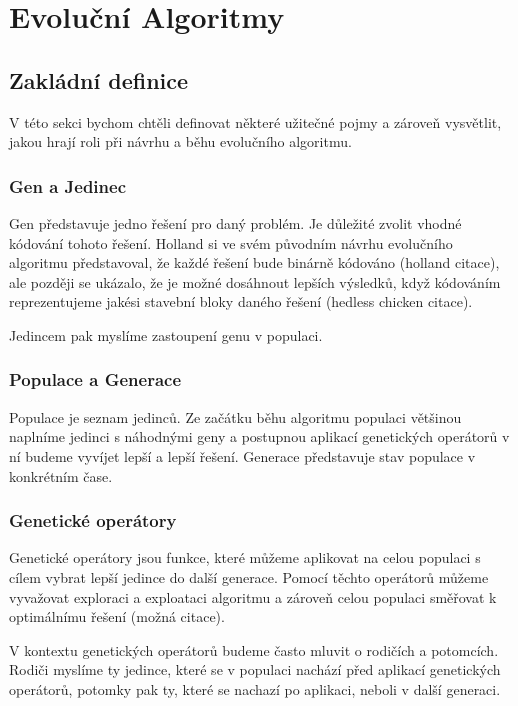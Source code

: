 \chapter{Evoluční Algoritmy}


\section{Zakládní definice}
V této sekci bychom chtěli definovat některé užitečné pojmy a zároveň vysvětlit, jakou hrají roli při návrhu a běhu evolučního algoritmu.

\subsection{Gen a Jedinec}
Gen představuje jedno řešení pro daný problém. Je důležité zvolit vhodné kódování tohoto řešení. Holland si ve svém původním návrhu evolučního algoritmu představoval, že každé řešení bude binárně kódováno (holland citace), ale později se ukázalo, že je možné dosáhnout lepších výsledků, když kódováním reprezentujeme jakési stavební bloky daného řešení (hedless chicken citace).

Jedincem pak myslíme zastoupení genu v populaci.

\subsection{Populace a Generace}
Populace je seznam jedinců. Ze začátku běhu algoritmu populaci většinou naplníme jedinci s náhodnými geny a postupnou aplikací genetických operátorů v ní budeme vyvíjet lepší a lepší řešení. Generace představuje stav populace v konkrétním čase.

\subsection{Genetické operátory}
Genetické operátory jsou funkce, které můžeme aplikovat na celou populaci s cílem vybrat lepší jedince do další generace. Pomocí těchto operátorů můžeme vyvažovat exploraci a exploataci algoritmu a zároveň celou populaci směřovat k optimálnímu řešení (možná citace).

V kontextu genetických operátorů budeme často mluvit o rodičích a potomcích. Rodiči myslíme ty jedince, které se v populaci nachází před aplikací genetických operátorů, potomky pak ty, které se nachazí po aplikaci, neboli v další generaci. 

